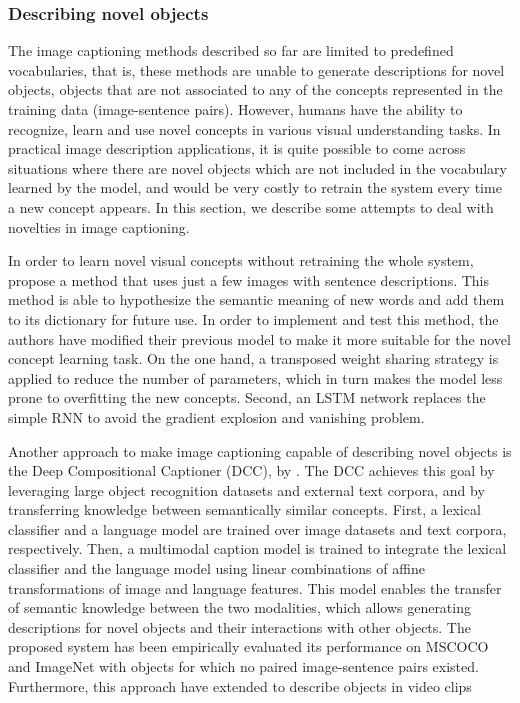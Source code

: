 \subsubsection{Describing novel objects}

The image captioning methods described so far are limited to predefined vocabularies, that is, these methods are unable to generate descriptions for novel objects, objects that are not associated to any of the concepts represented in the training data (image-sentence pairs). However, humans have the ability to recognize, learn and use novel concepts in various visual understanding tasks. In practical image description applications, it is quite possible to come across situations where there are novel objects which are not included in the vocabulary learned by the model, and would be very costly to retrain the system every time a new concept appears. In this section, we describe some attempts to deal with novelties in image captioning. 

In order to learn novel visual concepts without retraining the whole system, \citet{Mao2015b} propose a method that uses just a few images with sentence descriptions. This method is able to hypothesize the semantic meaning of new words and add them to its dictionary for future use. In order to implement and test this method, the authors have modified their previous model \citep{Mao2015a} to make it more suitable for the novel concept learning task. On the one hand, a transposed weight sharing strategy is applied to reduce the number of parameters, which in turn makes the model less prone to overfitting the new concepts. Second, an LSTM network replaces the simple RNN to avoid the gradient explosion and vanishing problem. 

Another approach to make image captioning capable of describing novel objects is the Deep Compositional Captioner (DCC), by \citet{Hendricks2016}. The DCC achieves this goal by leveraging large object recognition datasets and external text corpora, and by transferring knowledge between semantically similar concepts. First, a lexical classifier and a language model are trained over image datasets and text corpora, respectively. Then, a multimodal caption model is trained to integrate the lexical classifier and the language model using linear combinations of affine transformations of image and language features. This model enables the transfer of semantic knowledge between the two modalities, which allows generating descriptions for novel objects and their interactions with other objects. The proposed system has been empirically evaluated its performance on MSCOCO and ImageNet with objects for which no paired image-sentence pairs existed. Furthermore, this approach have extended to describe objects in video clips

